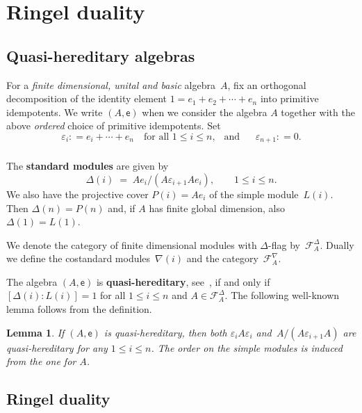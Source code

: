\documentclass[11pt]{amsart}
\newcommand{\cF}{{\mathcal{F}}}
\numberwithin{equation}{section}
\theoremstyle{plain}
\newtheorem{lemma}[subsubsection]{Lemma}
\theoremstyle{remark}
\theoremstyle{remark}
\theoremstyle{construction}
\begin{document}
\section{Ringel duality}

\subsection{Quasi-hereditary algebras}\label{QHAlg}
For a {\em finite dimensional, unital and basic} algebra~$A$, fix an orthogonal decomposition of the identity element $1=e_1+e_2+\cdots+e_n$ into primitive idempotents. We write $(A,\mathsf{e})$ when we consider the algebra $A$ together with the above {\em ordered} choice of primitive idempotents. Set 
$$\varepsilon_i{:}=e_i+\cdots+e_n\quad\mbox{for all $1\le i\le n,\;\,$ and }\quad\;\varepsilon_{n+1}{:}=0.$$


\subsubsection{}The {\bf standard modules} are given by
$$\Delta(i)\;=\;Ae_i/(A\varepsilon_{i+1}Ae_i),\qquad1\le i\le n.$$
We also have the projective cover $P(i)=Ae_i$ of the simple module~$L(i)$. 
{Then} $\Delta(n)=P(n)$ and, if $A$ has finite global dimension, also $\Delta(1)=L(1)$.




We denote the category of finite dimensional modules with $\Delta$-flag by~$\cF^{\Delta}_A$.
Dually {we} define the costandard modules~$\nabla(i)$ and the category~$\cF^{\nabla}_A$.



The algebra $(A,\mathsf{e})$ is {\bf quasi-hereditary}, see~\cite{CPS}, if and only if  $[\Delta(i):L(i)]=1$ for all $1\le i\le n$ and
 $A\in \cF_A^\Delta$. The following well-known lemma follows from the definition.


\begin{lemma}\label{LemBC}
If $(A,\mathsf{e})$ is quasi-hereditary, then both $\varepsilon_iA\varepsilon_i$ and~$A/(A\varepsilon_{i+1}A)$ are quasi-hereditary for any $1\le i\le n$. The order on the simple modules is induced from the one for $A$.
\end{lemma}


\subsection{Ringel duality}
\end{document}
